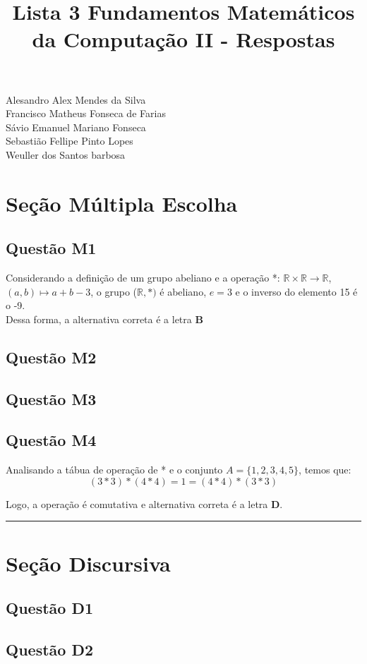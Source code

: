\documentclass{article}
\title{Lista 3 Fundamentos Matemáticos da Computação II - Respostas}
\begin{document}
\maketitle

\begin{center}
Alesandro Alex Mendes da Silva \\
Francisco Matheus Fonseca de Farias \\
Sávio Emanuel Mariano Fonseca \\
Sebastião Fellipe Pinto Lopes \\
Weuller dos Santos barbosa \\
\end{center}


\section{Seção Múltipla Escolha}

\subsection{Questão M1} 
Considerando a definição de um grupo abeliano e a operação
*: $\mathbb{R}\times\mathbb{R} \xrightarrow{} \mathbb{R}$, $(a,b) \mapsto a+b-3$, o grupo ($\mathbb{R},*)$ é abeliano, $e=3$ e o inverso do elemento 15 é o -9. \\

Dessa forma, a alternativa correta é a letra \textbf{B}


\subsection{Questão M2}
\subsection{Questão M3}
\subsection{Questão M4}
Analisando a tábua de operação de * e o conjunto $A = \{1, 2, 3, 4, 5\}$, temos que:
\[
(3*3)*(4*4) = 1 = (4*4)*(3*3) 
\]

Logo, a operação é comutativa e alternativa correta é a letra \textbf{D}.

\vspace{0.5em}
\hrule
\vspace{0.5em}

\section{Seção Discursiva}

\subsection{Questão D1}
\subsection{Questão D2}
\end{document}
